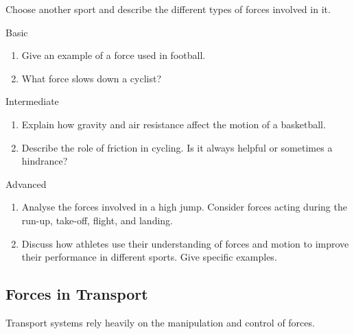 \begin{stopandthink}
Choose another sport and describe the different types of forces involved in it.
\end{stopandthink}

\begin{tieredquestions}{Basic}
\begin{enumerate}
    \item Give an example of a force used in football.
    \item What force slows down a cyclist?
\end{enumerate}
\end{tieredquestions}

\begin{tieredquestions}{Intermediate}
\begin{enumerate}
    \item Explain how gravity and air resistance affect the motion of a basketball.
    \item Describe the role of friction in cycling. Is it always helpful or sometimes a hindrance?
\end{enumerate}
\end{tieredquestions}

\begin{tieredquestions}{Advanced}
\begin{enumerate}
    \item  Analyse the forces involved in a high jump. Consider forces acting during the run-up, take-off, flight, and landing.
    \item  Discuss how athletes use their understanding of forces and motion to improve their performance in different sports. Give specific examples.
\end{enumerate}
\end{tieredquestions}


\subsection{Forces in Transport}

Transport systems rely heavily on the manipulation and control of forces.

